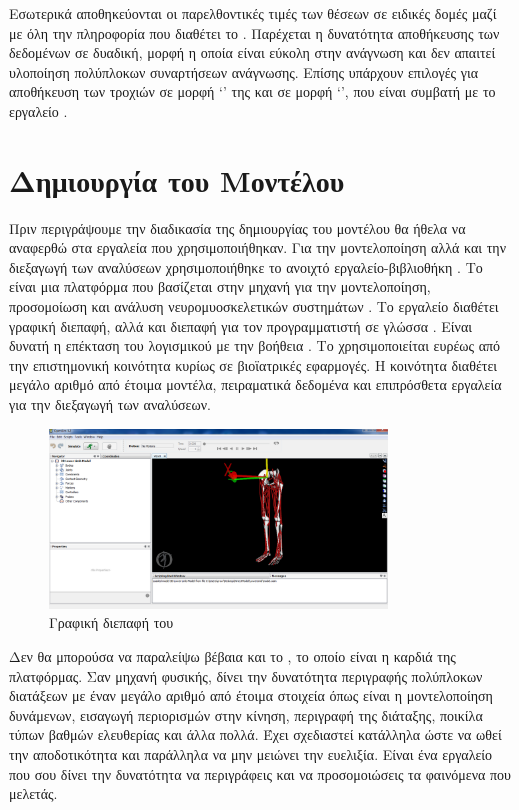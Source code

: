 Εσωτερικά αποθηκεύονται οι παρελθοντικές τιμές των θέσεων σε ειδικές δομές μαζί με όλη την πληροφορία που διαθέτει το . Παρέχεται η δυνατότητα αποθήκευσης των δεδομένων σε δυαδική, μορφή η οποία είναι εύκολη στην ανάγνωση και δεν απαιτεί υλοποίηση πολύπλοκων συναρτήσεων ανάγνωσης. Επίσης υπάρχουν επιλογές για αποθήκευση των τροχιών σε μορφή \lq {}\rq\; της  και σε μορφή \lq {}\rq  , που είναι συμβατή με το εργαλείο .

\section{Δημιουργία του Μοντέλου}

Πριν περιγράψουμε την διαδικασία της δημιουργίας του μοντέλου θα ήθελα να αναφερθώ στα εργαλεία που χρησιμοποιήθηκαν. Για την μοντελοποίηση αλλά και την διεξαγωγή των αναλύσεων χρησιμοποιήθηκε το ανοιχτό εργαλείο-βιβλιοθήκη . Το  είναι μια πλατφόρμα που βασίζεται στην μηχανή  για την μοντελοποίηση, προσομοίωση και ανάλυση νευρομυοσκελετικών συστημάτων \cite{delp07}. Το εργαλείο διαθέτει γραφική διεπαφή, αλλά και διεπαφή για τον προγραμματιστή σε γλώσσα . Είναι δυνατή η επέκταση του λογισμικού με την βοήθεια . Το  χρησιμοποιείται ευρέως από την επιστημονική κοινότητα κυρίως σε βιοϊατρικές εφαρμογές. Η κοινότητα διαθέτει μεγάλο αριθμό από έτοιμα μοντέλα, πειραματικά δεδομένα και επιπρόσθετα εργαλεία για την διεξαγωγή των αναλύσεων.

\begin{figure}[H]
    \centering
    \includegraphics[width=0.8\textwidth]{methods/fig/opensim.png}
    \caption{Γραφική διεπαφή του }
    \label{fig:opensim-gui}
\end{figure}

Δεν θα μπορούσα να παραλείψω βέβαια και το , το οποίο είναι η καρδιά της πλατφόρμας. Σαν μηχανή φυσικής, δίνει την δυνατότητα περιγραφής πολύπλοκων διατάξεων με έναν μεγάλο αριθμό από έτοιμα στοιχεία όπως είναι η μοντελοποίηση δυνάμενων, εισαγωγή περιορισμών στην κίνηση, περιγραφή της διάταξης, ποικίλα τύπων βαθμών ελευθερίας και άλλα πολλά. Έχει σχεδιαστεί κατάλληλα ώστε να ωθεί την αποδοτικότητα και παράλληλα να μην μειώνει την ευελιξία. Είναι ένα εργαλείο που σου δίνει την δυνατότητα να περιγράφεις και να προσομοιώσεις τα φαινόμενα που μελετάς.

